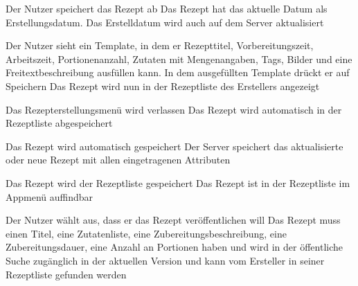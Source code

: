 {Der Nutzer speichert das Rezept ab}
{Das Rezept hat das aktuelle Datum als Erstellungsdatum. Das Erstelldatum wird auch auf dem Server aktualisiert}


{Der Nutzer sieht ein \Gls{Template}, in dem er Rezepttitel, Vorbereitungszeit, Arbeitszeit, Portionenanzahl, Zutaten mit Mengenangaben, \glspl{Tag}, Bilder und eine Freitextbeschreibung ausfüllen kann. In dem ausgefüllten Template drückt er auf Speichern}
{Das Rezept wird nun in der \gls{Rezeptliste} des Erstellers angezeigt}



{Das Rezepterstellungsmenü wird verlassen}
{Das Rezept wird automatisch in der \gls{Rezeptliste} abgespeichert}

{Das Rezept wird automatisch gespeichert}
{Der Server speichert das aktualisierte oder neue Rezept mit allen eingetragenen Attributen}


{Das Rezept wird der \gls{Rezeptliste} gespeichert}
{Das Rezept ist in der Rezeptliste im Appmenü auffindbar}


{Der Nutzer wählt aus, dass er das Rezept veröffentlichen will}
{Das Rezept muss einen Titel, eine Zutatenliste, eine Zubereitungsbeschreibung, eine Zubereitungsdauer, eine Anzahl an Portionen haben und wird in der öffentliche Suche zugänglich in der aktuellen Version und kann vom Ersteller in seiner \gls{Rezeptliste} gefunden werden}

